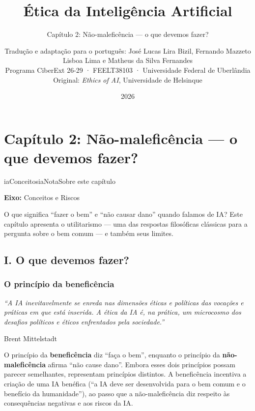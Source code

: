 \documentclass[
  11pt,
]{article}
\title{Ética da Inteligência Artificial}
\subtitle{Capítulo 2: Não-maleficência --- o que devemos fazer?}
\author{Tradução e adaptação para o português: José Lucas Lira Bizil,
Fernando Mazzeto Lisboa Lima e Matheus da Silva Fernandes\\
Programa CiberExt 26-29 · FEELT38103 · Universidade Federal de
Uberlândia\\
Original: \emph{Ethics of AI}, Universidade de Helsinque}
\date{2026}
\renewenvironment{quote}
  {\begin{tcolorbox}[
      breakable, enhanced jigsaw, rounded corners,
      arc=3pt, boxrule=0pt, frame hidden,
      colback=iaCaso,
      borderline west={3pt}{0pt}{iaRiscos},
      left=12pt, right=10pt, top=9pt, bottom=9pt,
      before skip=9pt, after skip=9pt]}
  {\end{tcolorbox}}
\newenvironment{nota}[1][Nota]{\begin{iabox}{iaConceitos}{iaNota}{#1}}{\end{iabox}}
\begin{document}
\maketitle

{
\hypersetup{linkcolor=iaConceitos}
\setcounter{tocdepth}{3}
\tableofcontents
}
\section{Capítulo 2: Não-maleficência --- o que devemos
fazer?}\label{capuxedtulo-2-nuxe3o-maleficuxeancia-o-que-devemos-fazer}

\begin{nota}[Sobre este capítulo]

\textbf{Eixo:} Conceitos e Riscos

O que significa ``fazer o bem'' e ``não causar dano'' quando falamos de
IA? Este capítulo apresenta o utilitarismo --- uma das respostas
filosóficas clássicas para a pergunta sobre o bem comum --- e também
seus limites.

\end{nota}

\subsection{I. O que devemos fazer?}\label{i.-o-que-devemos-fazer}

\subsubsection{O princípio da
beneficência}\label{o-princuxedpio-da-beneficuxeancia}

\begin{quote}
\emph{``A IA inevitavelmente se enreda nas dimensões éticas e políticas
das vocações e práticas em que está inserida. A ética da IA é, na
prática, um microcosmo dos desafios políticos e éticos enfrentados pela
sociedade.''}

Brent Mittelstadt
\end{quote}

O princípio da \textbf{beneficência} diz ``faça o bem'', enquanto o
princípio da \textbf{não-maleficência} afirma ``não cause dano''. Embora
esses dois princípios possam parecer semelhantes, representam princípios
distintos. A beneficência incentiva a criação de uma IA benéfica (``a IA
deve ser desenvolvida para o bem comum e o benefício da humanidade''),
ao passo que a não-maleficência diz respeito às consequências negativas
e aos riscos da IA.
\end{document}
